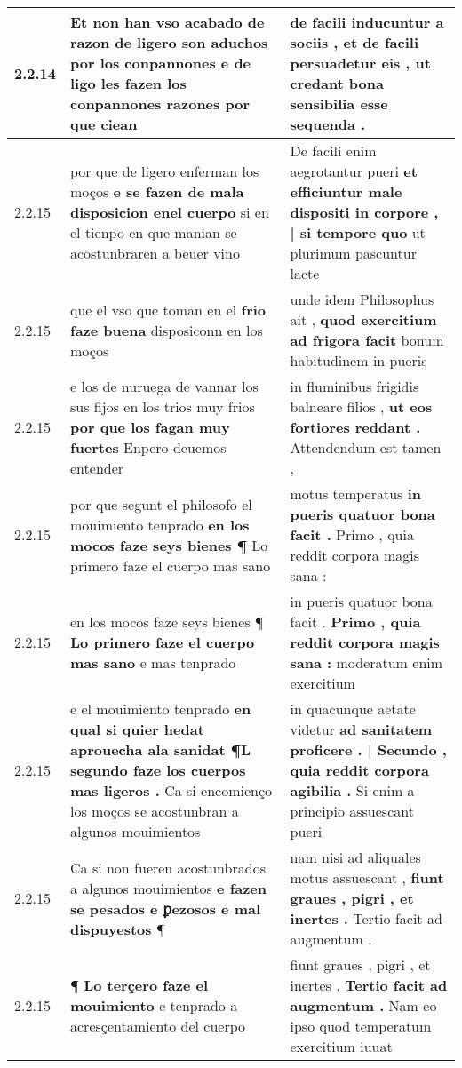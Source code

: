\begin{tabular}{|p{1cm}|p{6.5cm}|p{6.5cm}|}
2.2.14 & Et non han vso acabado de razon de ligero son aduchos por los conpannones \textbf{ e de ligo les fazen los conpannones razones } por que ciean & de facili inducuntur a sociis , \textbf{ et de facili persuadetur eis , } ut credant bona sensibilia esse sequenda . \\\hline
2.2.15 & por que de ligero enferman los moços \textbf{ e se fazen de mala disposicion enel cuerpo } si en el tienpo en que manian se acostunbraren a beuer vino & De facili enim aegrotantur pueri \textbf{ et efficiuntur male dispositi in corpore , | si tempore quo } ut plurimum pascuntur lacte \\\hline
2.2.15 & que el vso que toman en el \textbf{ frio faze buena } disposiconn en los moços & unde idem Philosophus ait , \textbf{ quod exercitium ad frigora facit } bonum habitudinem in pueris \\\hline
2.2.15 & e los de nuruega de vannar los sus fijos en los trios muy frios \textbf{ por que los fagan muy fuertes } Enpero deuemos entender & in fluminibus frigidis balneare filios , \textbf{ ut eos fortiores reddant . } Attendendum est tamen , \\\hline
2.2.15 & por que segunt el philosofo el mouimiento tenprado \textbf{ en los mocos faze seys bienes ¶ } Lo primero faze el cuerpo mas sano & motus temperatus \textbf{ in pueris quatuor bona facit . } Primo , quia reddit corpora magis sana : \\\hline
2.2.15 & en los mocos faze seys bienes ¶ \textbf{ Lo primero faze el cuerpo mas sano } e mas tenprado & in pueris quatuor bona facit . \textbf{ Primo , quia reddit corpora magis sana : } moderatum enim exercitium \\\hline
2.2.15 & e el mouimiento tenprado \textbf{ en qual si quier hedat aprouecha ala sanidat ¶L segundo faze los cuerpos mas ligeros . } Ca si encomienço los moços se acostunbran a algunos mouimientos & in quacunque aetate videtur \textbf{ ad sanitatem proficere . | Secundo , quia reddit corpora agibilia . } Si enim a principio assuescant pueri \\\hline
2.2.15 & Ca si non fueren acostunbrados a algunos mouimientos \textbf{ e fazen se pesados e ꝑezosos e mal dispuyestos } ¶ & nam nisi ad aliquales motus assuescant , \textbf{ fiunt graues , pigri , et inertes . } Tertio facit ad augmentum . \\\hline
2.2.15 & ¶ \textbf{ Lo terçero faze el mouimiento } e tenprado a acresçentamiento del cuerpo & fiunt graues , pigri , et inertes . \textbf{ Tertio facit ad augmentum . } Nam eo ipso quod temperatum exercitium iuuat \\\hline

\end{tabular}
